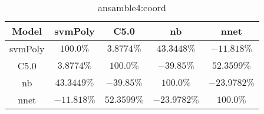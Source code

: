 \begin{table}[!ht]
	\centering
	\begin{tabular}{|c|c|c|c|c|}
		\hline
		Model & svmPoly & C5.0 & nb & nnet \\ \hline
		svmPoly & $100.0\%$ & $3.8774\%$ & $43.3448\%$ & $-11.818\%$ \\ \hline
		C5.0 & $3.8774\%$ & $100.0\%$ & $-39.85\%$ & $52.3599\%$ \\ \hline
		nb & $43.3449\%$ & $-39.85\%$ & $100.0\%$ & $-23.9782\%$ \\ \hline
		nnet & $-11.818\%$ & $52.3599\%$ & $-23.9782\%$ & $100.0\%$ \\ \hline
	\end{tabular}
	\caption{ansamble4:coord}
	\label{tab:ansamble4:coord}
\end{table}
